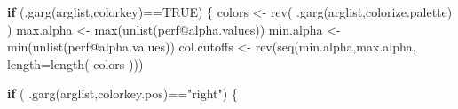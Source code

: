 \documentclass[
  letterpaper,
  DIV=11,
  numbers=noendperiod]{scrartcl}
\newenvironment{Shaded}{\begin{snugshade}}{\end{snugshade}}
\newcommand{\AttributeTok}[1]{\textcolor[rgb]{0.40,0.45,0.13}{#1}}
\newcommand{\ConstantTok}[1]{\textcolor[rgb]{0.56,0.35,0.01}{#1}}
\newcommand{\ControlFlowTok}[1]{\textcolor[rgb]{0.00,0.23,0.31}{\textbf{#1}}}
\newcommand{\FunctionTok}[1]{\textcolor[rgb]{0.28,0.35,0.67}{#1}}
\newcommand{\NormalTok}[1]{\textcolor[rgb]{0.00,0.23,0.31}{#1}}
\newcommand{\OtherTok}[1]{\textcolor[rgb]{0.00,0.23,0.31}{#1}}
\newcommand{\SpecialCharTok}[1]{\textcolor[rgb]{0.37,0.37,0.37}{#1}}
\newcommand{\StringTok}[1]{\textcolor[rgb]{0.13,0.47,0.30}{#1}}
\begin{document}
\begin{Shaded}
\begin{Highlighting}[]
    \ControlFlowTok{if}\NormalTok{ (}\FunctionTok{.garg}\NormalTok{(arglist,}\StringTok{\textquotesingle{}colorkey\textquotesingle{}}\NormalTok{)}\SpecialCharTok{==}\ConstantTok{TRUE}\NormalTok{) \{}
\NormalTok{        colors }\OtherTok{\textless{}{-}} \FunctionTok{rev}\NormalTok{( }\FunctionTok{.garg}\NormalTok{(arglist,}\StringTok{\textquotesingle{}colorize.palette\textquotesingle{}}\NormalTok{) )}
\NormalTok{        max.alpha }\OtherTok{\textless{}{-}} \FunctionTok{max}\NormalTok{(}\FunctionTok{unlist}\NormalTok{(perf}\SpecialCharTok{@}\NormalTok{alpha.values))}
\NormalTok{        min.alpha }\OtherTok{\textless{}{-}} \FunctionTok{min}\NormalTok{(}\FunctionTok{unlist}\NormalTok{(perf}\SpecialCharTok{@}\NormalTok{alpha.values))}
\NormalTok{        col.cutoffs }\OtherTok{\textless{}{-}} \FunctionTok{rev}\NormalTok{(}\FunctionTok{seq}\NormalTok{(min.alpha,max.alpha, }\AttributeTok{length=}\FunctionTok{length}\NormalTok{( colors )))}

        \ControlFlowTok{if}\NormalTok{ ( }\FunctionTok{.garg}\NormalTok{(arglist,}\StringTok{\textquotesingle{}colorkey.pos\textquotesingle{}}\NormalTok{)}\SpecialCharTok{==}\StringTok{"right"}\NormalTok{) \{}
            

\end{Highlighting}
\end{Shaded}
\end{document}
